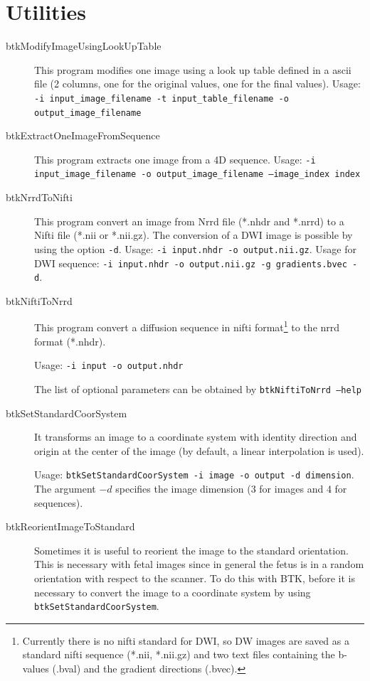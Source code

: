 \section{Utilities}
\label{sec:utilities}

\begin{description}

\item[btkModifyImageUsingLookUpTable] This program modifies one image using a
look up table defined in a ascii file (2 columns, one for the original values,
one for the final values). Usage: \texttt{-i input\_image\_filename -t
input\_table\_filename -o output\_image\_filename}
  
\item[btkExtractOneImageFromSequence] This program extracts one image from a 4D sequence. Usage: \texttt{-i input\_image\_filename -o output\_image\_filename --image\_index index}

\item[btkNrrdToNifti] This program convert an image from Nrrd file (*.nhdr and *.nrrd) to a Nifti file (*.nii or *.nii.gz). The conversion of a DWI image is possible by using the option \texttt{-d}. Usage: \texttt{-i input.nhdr -o output.nii.gz}. Usage for DWI sequence: \texttt{-i input.nhdr -o output.nii.gz -g gradients.bvec -d}.

\item[btkNiftiToNrrd] This program convert a diffusion sequence in nifti
format\footnote{Currently there is no nifti standard for DWI, so DW images are
saved as a standard nifti sequence (*.nii, *.nii.gz) and two text files
containing the b-values (.bval) and the gradient directions (.bvec).}  to the
nrrd format (*.nhdr). 

Usage: \texttt{-i input -o output.nhdr}

The list of optional parameters can be obtained by \texttt{btkNiftiToNrrd
--help}

\item[btkSetStandardCoorSystem] It transforms an image to a coordinate
system with identity direction and origin at the center of the image
(by default, a linear interpolation is used).

Usage: \texttt{btkSetStandardCoorSystem -i image -o output -d dimension}. The
argument $-d$ specifies the image dimension (3 for images and 4 for sequences). 
\\

  \item[btkReorientImageToStandard] Sometimes it is useful
to reorient the image to the standard orientation. This is necessary with fetal
images since in general the fetus is in a random orientation with respect to the
scanner. To do this with BTK, before it is necessary to convert the image
to a coordinate system by using \texttt{btkSetStandardCoorSystem}.


\end{description}
